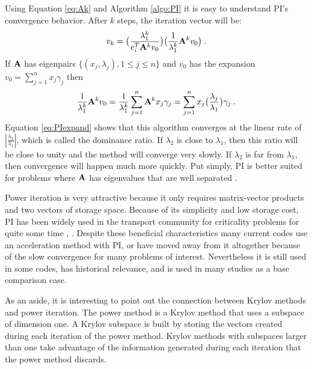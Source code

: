 Using Equation \eqref{eq:Ak} and Algorithm \ref{algo:PI} it is easy to understand PI's convergence behavior. After $k$ steps, the iteration vector will be: 
%
\begin{equation}
  v_{k} = \bigl( \frac{\lambda_{1}^{k}}{e_{i}^{T}\mathbf{A}^{k}v_{0}} \bigr) \bigl(\frac{1}{\lambda_{1}^{k}}\mathbf{A}^{k}v_{0} \bigr) \:.
\end{equation}
% 
If $\mathbf{A}$ has eigenpairs $\{(x_{j}, \lambda_{j}), 1 \le j \le n \}$ and $v_{0}$ has the expansion $v_{0} = \sum_{j=1}^{n} x_{j}\gamma_{j}$ then
%
\begin{equation}
  \frac{1}{\lambda_{1}^{k}}\mathbf{A}^{k}v_{0} =  \frac{1}{\lambda_{1}^{k}} \sum_{j=1}^{n} \mathbf{A}^{k}x_{j}\gamma_{j} = \sum_{j=1}^{n} x_{j} \bigl(\frac{\lambda_{j}}{\lambda_{1}} \bigr) \gamma_{j} \:.
  \label{eq:PIexpand}
\end{equation}
%
Equation \eqref{eq:PIexpand} shows that this algorithm converges at the linear rate of $|\frac{\lambda_{2}}{\lambda_{1}}|$, which is called the dominance ratio. If $\lambda_2$ is close to $\lambda_1$, then this ratio will be close to unity and the method will converge very slowly. If $\lambda_2$ is far from $\lambda_1$, then convergence will happen much more quickly. Put simply, PI is better suited for problems where $\mathbf{A}$ has eigenvalues that are well separated \cite{Sorensen1996}.  

Power iteration is very attractive because it only requires matrix-vector products and two vectors of storage space. Because of its simplicity and low storage cost, PI has been widely used in the transport community for criticality problems for quite some time \cite{Lewis1993}, \cite{Warsa2004a}. Despite these beneficial characteristics many current codes use an acceleration method with PI, or have moved away from it altogether because of the slow convergence for many problems of interest. Nevertheless it is still used in some codes, has historical relevance, and is used in many studies as a base comparison case. 

As an aside, it is interesting to point out the connection between Krylov methods and power iteration. The power method is a Krylov method that uses a subspace of dimension one.  A Krylov subspace is built by storing the vectors created during each iteration of the power method. Krylov methods with subspaces larger than one take advantage of the information generated during each iteration that the power method discards. 

